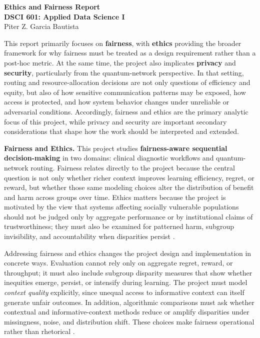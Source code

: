\documentclass[10pt]{article}
\begin{document}
\begin{center}
{\large\textbf{Ethics and Fairness Report}}\\
\textbf{DSCI 601: Applied Data Science I}\\
Piter Z. Garcia Bautista
\end{center}

This report primarily focuses on \textbf{fairness}, with \textbf{ethics} providing the broader framework for why fairness must be treated as a design requirement rather than a post-hoc metric. At the same time, the project also implicates \textbf{privacy} and \textbf{security}, particularly from the quantum-network perspective. In that setting, routing and resource-allocation decisions are not only questions of efficiency and equity, but also of how sensitive communication patterns may be exposed, how access is protected, and how system behavior changes under unreliable or adversarial conditions. Accordingly, fairness and ethics are the primary analytic focus of this project, while privacy and security are important secondary considerations that shape how the work should be interpreted and extended.

\textbf{Fairness and Ethics.}
This project studies \textbf{fairness-aware sequential decision-making} in two domains: clinical diagnostic workflows and quantum-network routing. Fairness relates directly to the project because the central question is not only whether richer context improves learning efficiency, regret, or reward, but whether those same modeling choices alter the distribution of benefit and harm across groups over time. Ethics matters because the project is motivated by the view that systems affecting socially vulnerable populations should not be judged only by aggregate performance or by institutional claims of trustworthiness; they must also be examined for patterned harm, subgroup invisibility, and accountability when disparities persist \cite{buyl2024,garciaBautista2025}.

Addressing fairness and ethics changes the project design and implementation in concrete ways. Evaluation cannot rely only on aggregate regret, reward, or throughput; it must also include subgroup disparity measures that show whether inequities emerge, persist, or intensify during learning. The project must model \emph{context quality} explicitly, since unequal access to informative context can itself generate unfair outcomes. In addition, algorithmic comparisons must ask whether contextual and informative-context methods reduce or amplify disparities under missingness, noise, and distribution shift. These choices make fairness operational rather than rhetorical \cite{buyl2024,leslie2023}.
\end{document}

